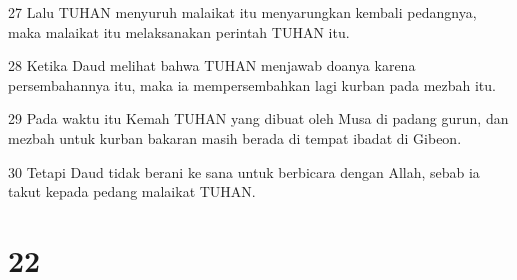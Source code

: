 \par 27 Lalu TUHAN menyuruh malaikat itu menyarungkan kembali pedangnya, maka malaikat itu melaksanakan perintah TUHAN itu.
\par 28 Ketika Daud melihat bahwa TUHAN menjawab doanya karena persembahannya itu, maka ia mempersembahkan lagi kurban pada mezbah itu.
\par 29 Pada waktu itu Kemah TUHAN yang dibuat oleh Musa di padang gurun, dan mezbah untuk kurban bakaran masih berada di tempat ibadat di Gibeon.
\par 30 Tetapi Daud tidak berani ke sana untuk berbicara dengan Allah, sebab ia takut kepada pedang malaikat TUHAN.

\chapter{22}

